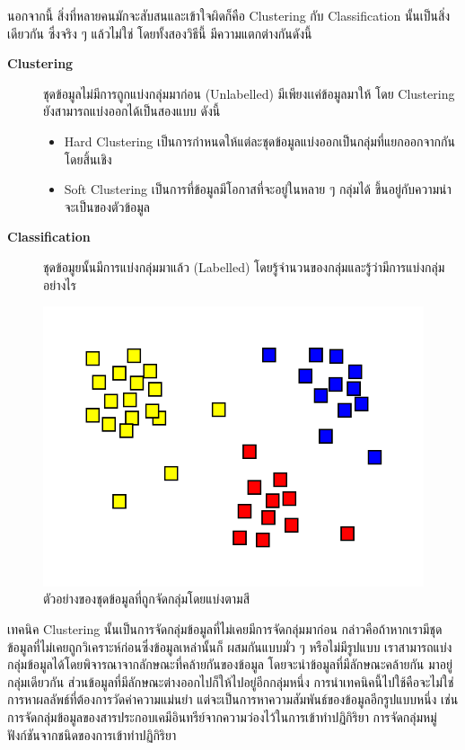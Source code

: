นอกจากนี้ สิ่งที่หลายคนมักจะสับสนและเข้าใจผิดก็คือ Clustering กับ Classification นั้นเป็นสิ่งเดียวกัน ซึ่งจริง ๆ แล้วไม่ใช่ โดยทั้งสองวิธีนี้%
มีความแตกต่างกันดังนี้

\begin{description}
    \item[\textbf{Clustering}] ชุดข้อมูลไม่มีการถูกแบ่งกลุ่มมาก่อน (Unlabelled) มีเพียงเเค่ข้อมูลมาให้ โดย Clustering 
    ยังสามารถแบ่งออกได้เป็นสองแบบ ดังนี้
    \begin{itemize}
        \item Hard Clustering เป็นการกำหนดให้แต่ละชุดข้อมูลแบ่งออกเป็นกลุ่มที่แยกออกจากกันโดยสิ้นเชิง
        \item Soft Clustering เป็นการที่ข้อมูลมีโอกาสที่จะอยู่ในหลาย ๆ กลุ่มได้ ขึ้นอยู่กับความน่าจะเป็นของตัวข้อมูล
    \end{itemize}
    \item[\textbf{Classification}] ชุดข้อมูยนั้นมีการแบ่งกลุ่มมาแล้ว (Labelled) โดยรู้จำนวนของกลุ่มและรู้ว่ามีการแบ่งกลุ่มอย่างไร
\end{description}

\begin{figure}[H]
    \centering
    \includegraphics[width=0.8\linewidth]{fig/cluster.png}
    \caption{ตัวอย่างของชุดข้อมูลที่ถูกจัดกลุ่มโดยแบ่งตามสี}
    \label{fig:cluster}
\end{figure}

เทคนิค Clustering นั้นเป็นการจัดกลุ่มข้อมูลที่ไม่เคยมีการจัดกลุ่มมาก่อน กล่าวคือถ้าหากเรามีชุดข้อมูลที่ไม่เคยถูกวิเคราะห์ก่อนซึ่งข้อมูลเหล่านั้นก็%
ผสมกันแบบมั่ว ๆ หรือไม่มีรูปแบบ เราสามารถแบ่งกลุ่มข้อมูลได้โดยพิจารณาจากลักษณะที่คล้ายกันของข้อมูล โดยจะนำข้อมูลที่มีลักษณะคล้ายกัน%
มาอยู่กลุ่มเดียวกัน ส่วนข้อมูลที่มีลักษณะต่างออกไปก็ให้ไปอยู่อีกกลุ่มหนึ่ง การนำเทคนิคนี้ไปใช้คือจะไม่ใช่การหาผลลัพธ์ที่ต้องการวัดค่าความแม่นยำ 
แต่จะเป็นการหาความสัมพันธ์ของข้อมูลอีกรูปแบบหนึ่ง เช่น การจัดกลุ่มข้อมูลของสารประกอบเคมีอินทรีย์จากความว่องไว้ในการเข้าทำปฏิกิริยา 
การจัดกลุ่มหมู่ฟังก์ชันจากชนิดของการเข้าทำปฏิกิริยา

